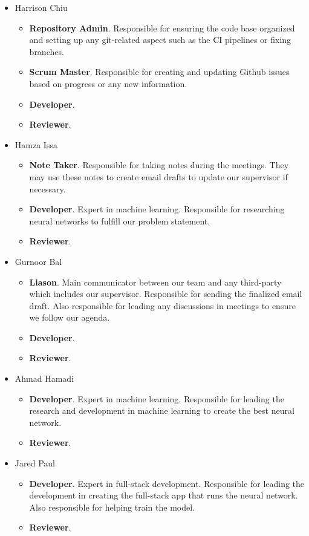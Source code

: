 \documentclass{article}
\begin{document}
\begin{itemize}
  \item Harrison Chiu
  \begin{itemize}
    \item \textbf{Repository Admin}. Responsible for ensuring the code base organized and
      setting up any git-related aspect such as the CI pipelines or fixing branches.
    \item \textbf{Scrum Master}. Responsible for creating and updating Github issues based on
      progress or any new information.
    \item \textbf{Developer}.
    \item \textbf{Reviewer}.
  \end{itemize}

  \item Hamza Issa
  \begin{itemize}
    \item \textbf{Note Taker}. Responsible for taking notes during the meetings. They may use
      these notes to create email drafts to update our supervisor if necessary.
    \item \textbf{Developer}. Expert in machine learning. Responsible for researching neural
      networks to fulfill our problem statement.
    \item \textbf{Reviewer}.
  \end{itemize}

  \item Gurnoor Bal
  \begin{itemize}
    \item \textbf{Liason}. Main communicator between our team and any third-party which includes 
      our supervisor. Responsible for sending the finalized email draft. Also responsible for 
      leading any discussions in meetings to ensure we follow our agenda.
    \item \textbf{Developer}.
    \item \textbf{Reviewer}.
  \end{itemize}

  \item Ahmad Hamadi
  \begin{itemize}
    \item \textbf{Developer}. Expert in machine learning. Responsible for leading the research and
    development in machine learning to create the best neural network.
    \item \textbf{Reviewer}.
  \end{itemize}

  \item Jared Paul
  \begin{itemize}
    \item \textbf{Developer}. Expert in full-stack development. Responsible for leading the 
      development in creating the full-stack app that runs the neural network. Also responsible for
      helping train the model.
    \item \textbf{Reviewer}.
  \end{itemize}
\end{itemize}
\end{document}
